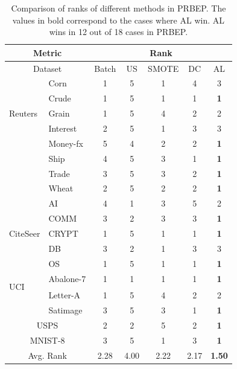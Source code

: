 \begin{table}[!t]\centering \small{
\caption{Comparison of ranks of different methods in PRBEP. The values in bold correspond to the cases where AL win. AL wins in 12 out of 18 cases in PRBEP.}
\begin{tabular}{l|l|c c c c c}
\hline
\multicolumn{2}{c|}{Metric}&\multicolumn{5}{c}{Rank}\\\hline
\multicolumn{2}{c|}{Dataset}&Batch&US&SMOTE&DC&AL\\
\hline\hline
\multirow{5}{5mm}{\begin{sideways}\parbox{13mm}{Reuters}\end{sideways}}
&Corn&1&5&1&4&3\\
&Crude&1&5&1&1&\textbf{1}\\
&Grain&1&5&4&2&2\\
&Interest&2&5&1&3&3\\
&Money-fx&5&4&2&2&\textbf{1}\\
&Ship&4&5&3&1&\textbf{1}\\
&Trade&3&5&3&2&\textbf{1}\\
&Wheat&2&5&2&2&\textbf{1}\\
\hline
\multirow{5}{5mm}{\begin{sideways}\parbox{12mm}{CiteSeer}\end{sideways}}
&AI&4&1&3&5&2\\
&COMM&3&2&3&3&\textbf{1}\\
&CRYPT&1&5&1&1&\textbf{1}\\
&DB&3&2&1&3&3\\
&OS&1&5&1&1&\textbf{1}\\
\hline
\multirow{2}{5mm}{\begin{sideways}\parbox{6mm}{UCI}\end{sideways}}
&Abalone-7&1&1&1&1&\textbf{1}\\
&Letter-A&1&5&4&2&2\\
&Satimage&3&5&3&1&\textbf{1}\\
\hline
\multicolumn{2}{c|}{USPS}&2&2&5&2&\textbf{1}\\
\hline
\multicolumn{2}{c|}{MNIST-8}&3&5&1&3&\textbf{1}\\
\hline
\hline
\multicolumn{2}{c|}{Avg. Rank }&2.28&4.00&2.22&2.17&\textbf{1.50}\\
\hline
\end{tabular}
\label{tbl:rankresults}
}
\end{table}

